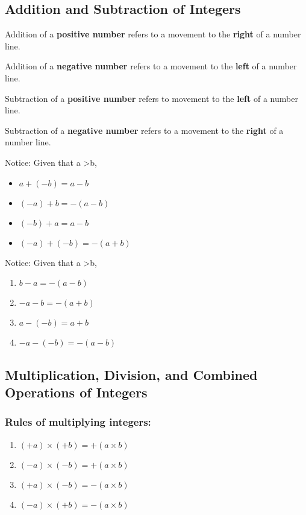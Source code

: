 \documentclass[../main]{subfiles}
\begin{document}
\subsection{Addition and Subtraction of Integers}

Addition of a \textbf{positive number} refers to a movement to the \textbf{right} of a
number line.

Addition of a \textbf{negative number} refers to a movement to the \textbf{left}
of a number line.

Subtraction of a \textbf{positive number} refers to movement to the
\textbf{left} of a number line.

Subtraction of a \textbf{negative number} refers to a movement to the
\textbf{right} of a number line.

Notice: Given that a \textgreater b,
\begin{itemize}
\item \(a + (-b) = a - b \)
\item \((-a) +b = -(a - b)\)
\item \((-b)+ a = a -b\)
\item \((-a)+(-b)= -(a+b)\)
\end{itemize}



Notice: Given that a \textgreater b,
\begin{enumerate}
\item \(b -a = -(a - b)\)
\item \(-a -b = -(a + b)\)
\item \(a - (-b) = a + b\)
\item \(-a -(-b) = - (a-b)\)
\end{enumerate}


\subsection{Multiplication, Division, and Combined Operations of Integers}
\subsubsection{Rules of multiplying integers:}
\begin{enumerate}
\item \((+a) \times (+b) = +(a \times b)\)  
\item \((-a) \times (-b) = +(a \times b)\) 
\item \((+a) \times (-b) = -(a \times b)\)
\item \((-a) \times (+b) = -(a \times b) \)

\end{enumerate}
\end{document}
